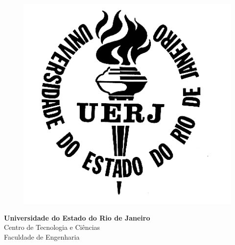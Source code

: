 \begin{titlepage}
\begin{center}

	\vspace{-0.5cm}

  \begin{figure}[hbt!]
		\begin{flushleft}
		   \includegraphics[scale=0.3]{./00_Pre_textuais/logo_uerj_pb.png}
		\end{flushleft}
	\end{figure}
	\vspace{-4cm}

  \hspace{2cm}\large{\textbf{Universidade do Estado do Rio de Janeiro}}\\
  \hspace{2cm}\large{Centro de Tecnologia e Ciências}\\
  \hspace{2cm}\large{Faculdade de Engenharia}\\

  \hspace{2cm}\large{}\\
  \hspace{2cm}\large{}\\
  \hspace{2cm}\large{}\\
  \hspace{2cm}\large{}\\

  \par
  {\large{\authorName}}


\end{center}
\end{titlepage}

